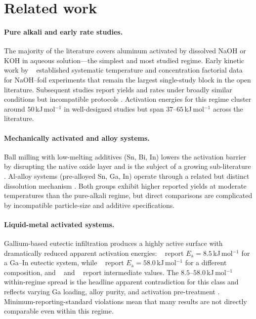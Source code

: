 \section{Related work}
\label{sec:related}

\paragraph{Pure alkali and early rate studies.}
The majority of the literature covers aluminum activated by dissolved NaOH or KOH in
aqueous solution---the simplest and most studied regime. Early kinetic work by
\citeauthor{porciuncula2012}~\citep{porciuncula2012} established systematic temperature and
concentration factorial data for NaOH–foil experiments that remain the largest single-study
block in the open literature. Subsequent studies report yields and rates under broadly
similar conditions but incompatible protocols
\citep{wen2018,wanghq2017,yavor2013,trowell2022,deng2010,prabu2021,rin2021,zhang2024}.
Activation energies for this regime cluster around $50$\,kJ\,mol$^{-1}$ in well-designed
studies but span $37$--$65$\,kJ\,mol$^{-1}$ across the literature.

\paragraph{Mechanically activated and alloy systems.}
Ball milling with low-melting additives (Sn, Bi, In) lowers the activation barrier by
disrupting the native oxide layer and is the subject of a growing sub-literature
\citep{xiao2018,guan2019,preez2018,chen2020,xiao2020,davies2022mat}. Al-alloy systems
(pre-alloyed Sn, Ga, In) operate through a related but distinct dissolution mechanism
\citep{liuyh2017,qiao2019,meng2022}. Both groups exhibit higher reported yields at
moderate temperatures than the pure-alkali regime, but direct comparisons are complicated
by incompatible particle-size and additive specifications.

\paragraph{Liquid-metal activated systems.}
Gallium-based eutectic infiltration produces a highly active surface with dramatically
reduced apparent activation energies: \citeauthor{ilyukhina2012}~\citep{ilyukhina2012}
report $E_\mathrm{a}\!=\!8.5$\,kJ\,mol$^{-1}$ for a Ga--In eutectic system, while
\citeauthor{dudoladov2016}~\citep{dudoladov2016} report $E_\mathrm{a}\!=\!58.0$\,kJ\,mol$^{-1}$
for a different composition, and \citeauthor{jayaraman2015}~\citep{jayaraman2015} and
\citeauthor{lu2017}~\citep{lu2017} report intermediate values. The $8.5$--$58.0$\,kJ\,mol$^{-1}$
within-regime spread is the headline apparent contradiction for this class and reflects
varying Ga loading, alloy purity, and activation pre-treatment
\citep{fischman2020}. Minimum-reporting-standard violations mean that many results are
not directly comparable even within this regime.

